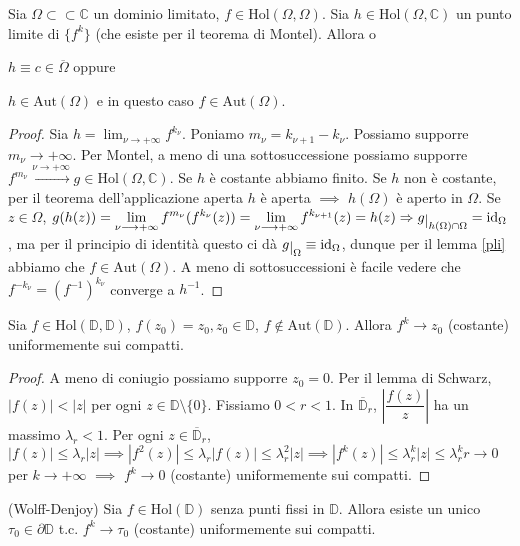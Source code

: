 \begin{prop}
  Sia $\Omega \subset \subset \mathbb{C}$ un dominio limitato, $f \in \text{Hol}(\Omega, \Omega)$. Sia $h \in \text{Hol}(\Omega, \mathbb{C})$ un punto limite di $\{f^k\}$ (che esiste per il teorema di Montel). Allora o
  \begin{nlist}
    \item $h \equiv c \in \overline{\Omega}$ oppure
    \item $h \in \text{Aut}(\Omega)$ e in questo caso $f \in \text{Aut}(\Omega)$.
  \end{nlist}
\end{prop}

\begin{proof}
  Sia $\displaystyle h=\lim_{\nu \longrightarrow +\infty} f^{k_{\nu}}$. Poniamo $m_{\nu}=k_{\nu+1}-k_{\nu}$. Possiamo supporre $m_{\nu} \longrightarrow +\infty$. Per Montel, a meno di una sottosuccessione possiamo supporre $f^{m_{\nu}} \xrightarrow{\nu \longrightarrow +\infty} g \in \text{Hol}(\Omega, \mathbb{C})$.
  Se $h$ è costante abbiamo finito. Se $h$ non è costante, per il teorema dell'applicazione aperta $h$ è aperta $\implies$ $h(\Omega)$ è aperto in $\Omega$.
  Se $z \in \Omega$, $\displaystyle g(h(z))=\lim_{\nu \longrightarrow +\infty} f^{m_{\nu}}(f^{k_{\nu}}(z))=\lim_{\nu \longrightarrow +\infty} f^{k_{\nu+1}}(z)=h(z) \implies g\restrict{h(\Omega) \cap \Omega}=\id_{\Omega}$,
  ma per il principio di identità questo ci dà $g\restrict{\Omega} \equiv \id_{\Omega}$, dunque per il lemma \ref{pli} abbiamo che $f \in \text{Aut}(\Omega)$. A meno di sottosuccessioni è facile vedere che $f^{-k_{\nu}}=(f^{-1})^{k_{\nu}}$ converge a $h^{-1}$.
\end{proof}

\begin{prop}
  Sia $f \in \text{Hol}(\mathbb{D}, \mathbb{D})$, $f(z_0)=z_0, z_0 \in \mathbb{D}$, $f\not\in \text{Aut}(\mathbb{D})$. Allora $f^k \longrightarrow z_0$ (costante) uniformemente sui compatti.
\end{prop}

\begin{proof}
  A meno di coniugio possiamo supporre $z_0=0$. Per il lemma di Schwarz, $|f(z)|<|z|$ per ogni $z \in \mathbb{D}\setminus\{0\}$. Fissiamo $0<r<1$. In $\overline{\mathbb{D}}_r$, $\left|\dfrac{f(z)}{z}\right|$ ha un massimo $\lambda_r<1$.
  Per ogni $z \in \overline{\mathbb{D}}_r$, $|f(z)| \le \lambda_r|z| \implies |f^2(z)| \le \lambda_r|f(z)| \le \lambda_r^2|z| \implies |f^k(z)| \le \lambda_r^k|z| \le \lambda_r^kr \longrightarrow 0$ per $k \longrightarrow +\infty$ $\implies$ $f^k \longrightarrow 0$ (costante) uniformemente sui compatti.
\end{proof}

\begin{thm}
  (Wolff-Denjoy) Sia $f \in \text{Hol}(\mathbb{D})$ senza punti fissi in $\mathbb{D}$. Allora esiste un unico $\tau_0 \in \partial\mathbb{D}$ t.c. $f^k \longrightarrow \tau_0$ (costante) uniformemente sui compatti.
\end{thm}
